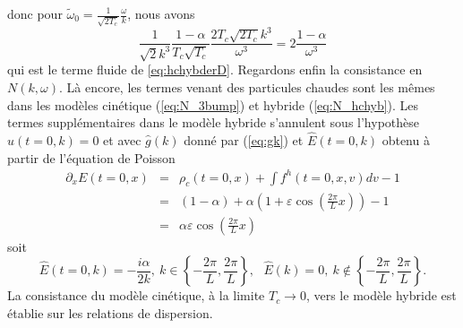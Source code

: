 donc pour $\tilde{\omega}_0=\frac{1}{\sqrt{2T_c}}\frac{\omega}{k}$, nous avons 
$$
  \frac{1}{\sqrt{2}k^3}\frac{1-\alpha}{T_c\sqrt{T_c}}\frac{2T_c\sqrt{2T_c}k^3}{\omega^3}=2\frac{1-\alpha}{\omega^3}
$$
qui est le terme fluide de \eqref{eq:hchybderD}. Regardons enfin la consistance en $N(k,\omega)$. Là encore, les termes venant des particules chaudes sont les mêmes dans les modèles cinétique (\ref{eq:N_3bump}) et hybride (\ref{eq:N_hchyb}). Les termes supplémentaires dans le modèle hybride s'annulent sous l'hypothèse $\hat{u}(t=0,k)=0$ et avec $\hat{g}(k)$ donné par (\ref{eq:gk}) et $\hat{E}(t=0,k)$ obtenu à partir de l'équation de Poisson 
\begin{eqnarray*}
  \partial_xE(t=0,x)&=& \rho_c(t=0,x)+\int f^h(t=0,x,v)dv-1\\
                    &=& \left(1-\alpha\right)+\alpha\left(1+\varepsilon\cos\left(\frac{2\pi}{L}x\right)\right)-1\\
                    &=& \alpha\varepsilon\cos\left(\frac{2\pi}{L}x\right)
\end{eqnarray*}
soit
\begin{equation}
  \hat{E}\left(t=0,k\right)=-\frac{i\alpha}{2k},~k\in\left\{-\frac{2\pi}{L},\frac{2\pi}{L}\right\},~~~\hat{E}(k)=0,~k\notin\left\{-\frac{2\pi}{L},\frac{2\pi}{L}\right\}.
\label{eq:Ekbis}
\end{equation}
La consistance du modèle cinétique, à la limite $T_c\to 0$, vers le modèle hybride est établie sur les relations de dispersion.

